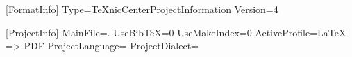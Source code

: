 [FormatInfo]
Type=TeXnicCenterProjectInformation
Version=4

[ProjectInfo]
MainFile=.
UseBibTeX=0
UseMakeIndex=0
ActiveProfile=LaTeX => PDF
ProjectLanguage=
ProjectDialect=

